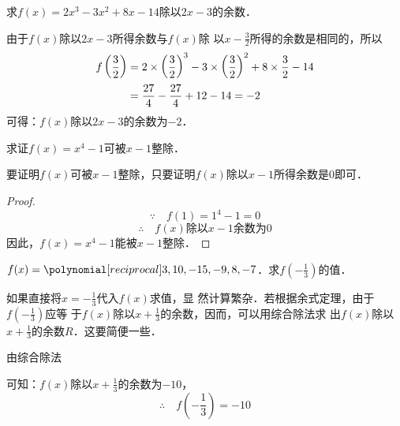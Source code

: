 \begin{example}
    求$f(x)=2x^3-3x^2+8x-14$除以$2x-3$的余数．
\end{example}

\begin{solution}
    由于$f(x)$除以$2x-3$所得余数与$f(x)$除
    以$x-\frac{3}{2}$所得的余数是相同的，所以
\[\begin{split}
f\left(\dfrac{3}{2}\right)&=2\times\left(\dfrac{3}{2}\right)^3-3\times\left(\dfrac{3}{2}\right)^2+8\times\dfrac{3}{2}-14\\
&=\dfrac{27}{4}-\dfrac{27}{4}+12-14=-2
\end{split}\]
可得：$f(x)$除以$2x-3$的余数为$-2$．
\end{solution}

\begin{example}
 求证$f(x)=x^4-1$可被$x-1$整除．   
\end{example}

\begin{analyze}
   要证明$f(x)$可被$x-1$整除，只要证明$f(x)$除以$x-1$所得余数是0即可．
\end{analyze}

\begin{proof}
\[\because\quad f(1)=1^4-1=0\]
\[\therefore\quad f(x)\text{除以}x-1\text{余数为0}\]
因此，$f(x)=x^4-1$能被$x-1$整除．
\end{proof}

\begin{example}
$f(x)=\poly{3,10,-15,-9,8,-7}$．求$f\left(-\frac{1}{3}\right)$的值．
\end{example}

\begin{note}
如果直接将$x=-\frac{1}{3}$代入$f(x)$求值，显
    然计算繁杂．若根据余式定理，由于$f\left(-\frac{1}{3}\right)$应等
    于$f(x)$除以$x+\frac{1}{3}$的余数，因而，可以用综合除法求
    出$f(x)$除以$x+\frac{1}{3}$的余数$R$．这要简便一些．
\end{note}

\begin{solution}
由综合除法
\begin{center}
    \end{center}
可知：$f(x)$除以$x+\frac{1}{3}$的余数为$-10$，
\[\therefore\quad f\left(-\frac{1}{3}\right)=-10\]
\end{solution}

